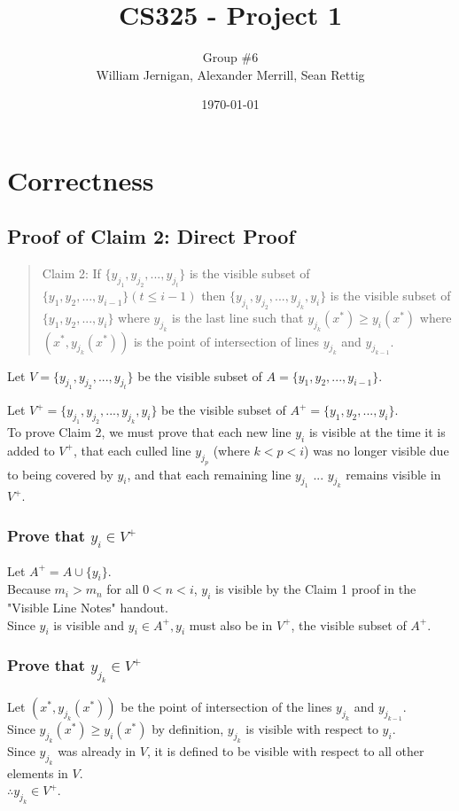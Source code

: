 \documentclass{article}
\title{CS325 - Project 1}
\author{Group \#6 \\ William Jernigan, Alexander Merrill, Sean Rettig}
\date{\today}
\begin{document}
\maketitle

\section*{Correctness}
\subsection*{Proof of Claim 2: Direct Proof}

\begin{quote}
Claim 2: If $\{y_{j_1}, y_{j_2},...,y_{j_{t}}\}$ is the visible subset of $\{y_1, y_2,...,y_{i - 1}\} (t \leq i - 1)$ then $\{y_{j_1}, y_{j_2},...,y_{j_{k}}, y_i\}$ is the visible subset of $\{y_1, y_2,...,y_{i}\}$ where $y_{j_{k}}$ is the last line such that $y_{j_{k}} (x^*) \geq y_i (x^*)$ where $(x^*, y_{j_{k}}(x^*))$ is the point of intersection of lines $y_{j_{k}}$ and $y_{j_{k - 1}}$.
\end{quote}

Let $V=\{y_{j_1}, y_{j_2},...,y_{j_{t}}\}$ be the visible subset of $A=\{y_1, y_2,...,y_{i - 1}\}$.

Let $V^+=\{y_{j_1}, y_{j_2},...,y_{j_{k}}, y_i\}$ be the visible subset of $A^+=\{y_1, y_2,...,y_{i}\}$.\\

To prove Claim 2, we must prove that each new line $y_i$ is visible at the time it is added to $V^+$, that each culled line $y_{j_p}$ (where $k < p < i$) was no longer visible due to being covered by $y_i$, and that each remaining line $y_{j_1}$ ... $y_{j_k}$ remains visible in $V^+$.

\subsubsection*{Prove that $y_{i} \in V^+$}
Let $A^+ = A \cup \{y_i\}$.\\
Because $m_i > m_n$ for all $0 < n < i$, $y_i$ is visible by the Claim 1 proof in the "Visible Line Notes" handout.\\
Since $y_i$ is visible and $y_i \in A^+, y_i$ must also be in $V^+$, the visible subset of $A^+$.

\subsubsection*{Prove that $y_{j_k} \in V^+$}
Let $(x^*, y_{j_k} (x^*))$ be the point of intersection of the lines $y_{j_k}$ and $y_{j_{k-1}}$.\\
Since $y_{j_k} (x^*) \geq y_i (x^*)$ by definition, $y_{j_k}$ is visible with respect to $y_i$.\\
Since $y_{j_k}$ was already in $V$, it is defined to be visible with respect to all other elements in $V$.\\
$\therefore y_{j_k} \in V^+$.
\end{document}
